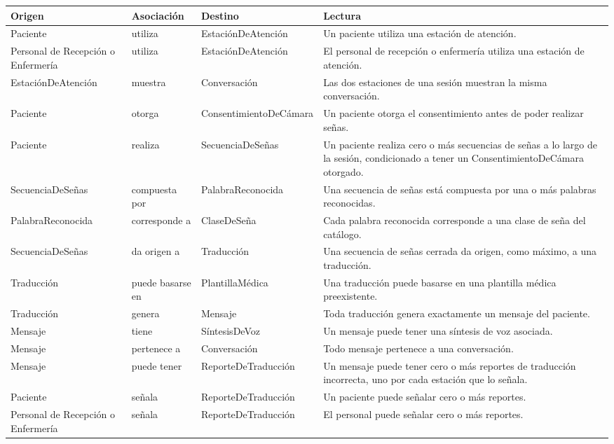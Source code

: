 \begin{longtable}{p{3.4cm} p{3.6cm} p{3.4cm} p{3.6cm}}
    \toprule
    \textbf{Origen} & \textbf{Asociación} & \textbf{Destino} & \textbf{Lectura} \\
    \midrule
    \endhead
    Paciente & utiliza & Estación\-De\-Atención & Un paciente utiliza una estación de atención. \\
    Personal de Recepción o Enfermería & utiliza & Estación\-De\-Atención & El personal de recepción o enfermería utiliza una estación de atención. \\
    Estación\-De\-Atención & muestra & Conversación & Las dos estaciones de una sesión muestran la misma conversación. \\
    Paciente & otorga & Consentimiento\-De\-Cámara & Un paciente otorga el consentimiento antes de poder realizar señas. \\
    Paciente & realiza & Secuencia\-De\-Señas & Un paciente realiza cero o más secuencias de señas a lo largo de la sesión, condicionado a tener un Consentimiento\-De\-Cámara otorgado. \\
    Secuencia\-De\-Señas & compuesta por & Palabra\-Reconocida & Una secuencia de señas está compuesta por una o más palabras reconocidas. \\
    Palabra\-Reconocida & corresponde a & Clase\-De\-Seña & Cada palabra reconocida corresponde a una clase de seña del catálogo. \\
    Secuencia\-De\-Señas & da origen a & Traducción & Una secuencia de señas cerrada da origen, como máximo, a una traducción. \\
    Traducción & puede basarse en & Plantilla\-Médica & Una traducción puede basarse en una plantilla médica preexistente. \\
    Traducción & genera & Mensaje & Toda traducción genera exactamente un mensaje del paciente. \\
    Mensaje & tiene & Síntesis\-De\-Voz & Un mensaje puede tener una síntesis de voz asociada. \\
    Mensaje & pertenece a & Conversación & Todo mensaje pertenece a una conversación. \\
    Mensaje & puede tener & Reporte\-De\-Traducción & Un mensaje puede tener cero o más reportes de traducción incorrecta, uno por cada estación que lo señala. \\
    Paciente & señala & Reporte\-De\-Traducción & Un paciente puede señalar cero o más reportes. \\
    Personal de Recepción o Enfermería & señala & Reporte\-De\-Traducción & El personal puede señalar cero o más reportes. \\

\end{longtable}
